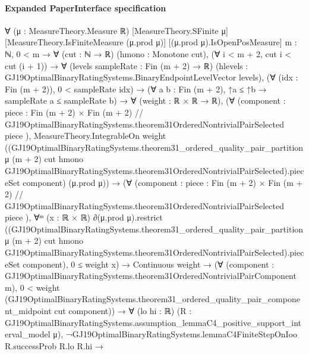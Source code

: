\documentclass[10pt]{article}
\begin{document}
\paragraph{Expanded PaperInterface specification}
\begin{ReviewVerbatim}
∀ (μ : MeasureTheory.Measure ℝ) [MeasureTheory.SFinite μ] [MeasureTheory.IsFiniteMeasure (μ.prod μ)]
  [(μ.prod μ).IsOpenPosMeasure] {m : ℕ},
  0 < m →
    ∀ (cut : ℕ → ℝ) (hmono : Monotone cut),
      (∀ i < m + 2, cut i < cut (i + 1)) →
        ∀ (levels sampleRate : Fin (m + 2) → ℝ)
          (hlevels : GJ19OptimalBinaryRatingSystems.BinaryEndpointLevelVector levels),
          (∀ (idx : Fin (m + 2)), 0 < sampleRate idx) →
            (∀ {a b : Fin (m + 2)}, ↑a ≤ ↑b → sampleRate a ≤ sampleRate b) →
              ∀ (weight : ℝ × ℝ → ℝ),
                (∀
                    (component :
                      { piece : Fin (m + 2) × Fin (m + 2) //
                        GJ19OptimalBinaryRatingSystems.theorem31OrderedNontrivialPairSelected piece }),
                    MeasureTheory.IntegrableOn weight
                      ((GJ19OptimalBinaryRatingSystems.theorem31_ordered_quality_pair_partition μ (m + 2) cut hmono
                            GJ19OptimalBinaryRatingSystems.theorem31OrderedNontrivialPairSelected).pieceSet
                        component)
                      (μ.prod μ)) →
                  (∀
                      (component :
                        { piece : Fin (m + 2) × Fin (m + 2) //
                          GJ19OptimalBinaryRatingSystems.theorem31OrderedNontrivialPairSelected piece }),
                      ∀ᵐ (x :
                        ℝ ×
                          ℝ) ∂(μ.prod μ).restrict
                          ((GJ19OptimalBinaryRatingSystems.theorem31_ordered_quality_pair_partition μ (m + 2) cut hmono
                                GJ19OptimalBinaryRatingSystems.theorem31OrderedNontrivialPairSelected).pieceSet
                            component),
                        0 ≤ weight x) →
                    Continuous weight →
                      (∀ (component : GJ19OptimalBinaryRatingSystems.theorem31OrderedNontrivialPairComponent m),
                          0 <
                            weight
                              (GJ19OptimalBinaryRatingSystems.theorem31_ordered_quality_pair_component_midpoint cut
                                component)) →
                        ∀ (lo hi : ℝ)
                          (R : GJ19OptimalBinaryRatingSystems.assumption_lemmaC4_positive_support_interval_model μ),
                          ¬GJ19OptimalBinaryRatingSystems.lemmaC4FiniteStepOnIoo R.successProb R.lo R.hi →

\end{ReviewVerbatim}
\end{document}
